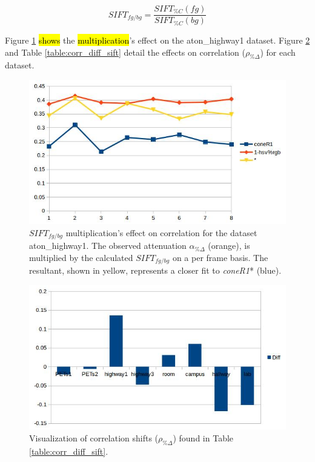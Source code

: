 \documentclass[12pt]{report}
\begin{document}
\begin{equation}
SIFT_{fg/bg} = \dfrac{SIFT_{\%C}(fg)}{SIFT_{\%C}(bg)}
\end{equation}

Figure \ref{fig:highway1_sift} \hl{shows} the \hl{multiplication}'s effect on the aton\_highway1 dataset. Figure \ref{fig:corr_diff_sift} and Table \ref{table:corr_diff_sift} detail the effects on correlation ($\rho_{\%\Delta}$) for each dataset.

\begin{figure}
  \includegraphics[width=1\linewidth]{figures/highway1_sift.jpg}
\caption{$SIFT_{fg/bg}$ multiplication's effect on correlation for the dataset aton\_highway1. The observed attenuation $\alpha_{\%\Delta}$ (orange), is multiplied by the calculated $SIFT_{fg/bg}$ on a per frame basis. The resultant, shown in yellow, represents a closer fit to \textit{coneR1}* (blue).}
\label{fig:highway1_sift}
\end{figure}

\begin{figure}
  \includegraphics[width=1\linewidth]{figures/sift_correlation_diff.jpg}
\caption{Visualization of correlation shifts ($\rho_{\%\Delta}$) found in Table \ref{table:corr_diff_sift}.}
\label{fig:corr_diff_sift}
\end{figure}
\end{document}
